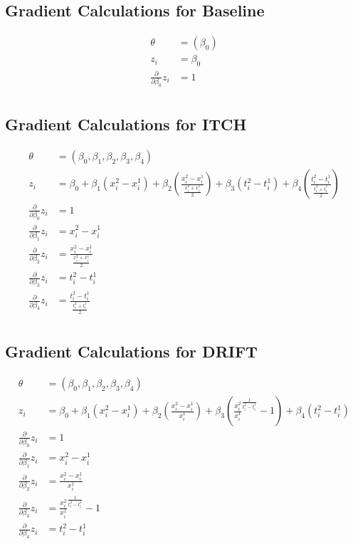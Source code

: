 \documentclass[12pt]{article}
\begin{document}
\subsection{Gradient Calculations for Baseline}

\begin{align*}
\theta &= (\beta_0) \\
z_i &= \beta_0 \\
\frac{\partial}{\partial \beta_0} z_i &= 1 \\
\end{align*}

\subsection{Gradient Calculations for ITCH}

\begin{align*}
\theta &= (\beta_0, \beta_1, \beta_2, \beta_3, \beta_4) \\
z_i &= \beta_0
  + \beta_1 (x^2_i - x^1_i)
  + \beta_2 (\frac{x^2_i - x^1_i}{\frac{x^2_i + x^1_i}{2}})
  + \beta_3 (t^2_i - t^1_i)
  + \beta_4 (\frac{t^2_i - t^1_i}{\frac{t^2_i + t^1_i}{2}}) \\
\frac{\partial}{\partial \beta_0} z_i &= 1 \\
\frac{\partial}{\partial \beta_1} z_i &= x^2_i - x^1_i \\
\frac{\partial}{\partial \beta_2} z_i &= \frac{x^2_i - x^1_i}{\frac{x^2_i + x^1_i}{2}} \\
\frac{\partial}{\partial \beta_3} z_i &= t^2_i - t^1_i \\
\frac{\partial}{\partial \beta_4} z_i &= \frac{t^2_i - t^1_i}{\frac{t^2_i + t^1_i}{2}} \\
\end{align*}

\subsection{Gradient Calculations for DRIFT}

\begin{align*}
\theta &= (\beta_0, \beta_1, \beta_2, \beta_3, \beta_4) \\
z_i &= \beta_0
  + \beta_1 (x^2_i - x^1_i)
  + \beta_2 (\frac{x^2_i - x^1_i}{x^1_i})
  + \beta_3 (\frac{x^2_i}{x^1_i}^{\frac{1}{t^2_i - t^1_i}} - 1)
  + \beta_4 (t^2_i - t^1_i) \\
\frac{\partial}{\partial \beta_0} z_i &= 1 \\
\frac{\partial}{\partial \beta_1} z_i &= x^2_i - x^1_i \\
\frac{\partial}{\partial \beta_2} z_i &= \frac{x^2_i - x^1_i}{x^1_i} \\
\frac{\partial}{\partial \beta_3} z_i &= \frac{x^2_i}{x^1_i}^{\frac{1}{t^2_i - t^1_i}} - 1 \\
\frac{\partial}{\partial \beta_4} z_i &= t^2_i - t^1_i \\
\end{align*}
\end{document}
